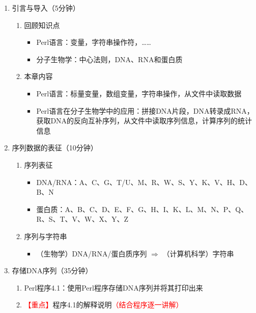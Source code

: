 \documentclass{TIJMUjiaoanLL}
\begin{document}
\firstTail

\newpage
\otherHeader

\begin{enumerate}
  \item 引言与导入（5分钟）
    \begin{enumerate}
      \item 回顾知识点
	\begin{itemize}
	  \item Perl语言：变量，字符串操作符，……
	  \item 分子生物学：中心法则，DNA、RNA和蛋白质
	\end{itemize}
      \item 本章内容
	\begin{itemize}
	  \item Perl语言：标量变量，数组变量，字符串操作，从文件中读取数据
	  \item Perl语言在分子生物学中的应用：拼接DNA片段，DNA转录成RNA，获取DNA的反向互补序列，从文件中读取序列信息，计算序列的统计信息
	\end{itemize}
    \end{enumerate}
  \item 序列数据的表征（10分钟）
    \begin{enumerate}
      \item 序列表征
	\begin{itemize}
	  \item DNA/RNA：A、C、G、T/U、M、R、W、S、Y、K、V、H、D、B、N
	  \item 蛋白质：A、B、C、D、E、F、G、H、I、K、L、M、N、P、Q、R、S、T、V、W、X、Y、Z
	\end{itemize}
      \item 序列与字符串
	\begin{itemize}
	  \item （生物学）DNA/RNA/蛋白质序列 $\Longrightarrow$ （计算机科学）字符串
	\end{itemize}
    \end{enumerate}
  \item 存储DNA序列（35分钟）
    \begin{enumerate}
      \item Perl程序4.1：使用Perl程序存储DNA序列并将其打印出来
      \item \textcolor{red}{【重点】}程序4.1的解释说明\textcolor{red}{（结合程序逐一讲解）}
\vspace*{-1em}
\begin{multicols}{2}

\end{multicols}
\end{enumerate}
\end{enumerate}
\end{document}
